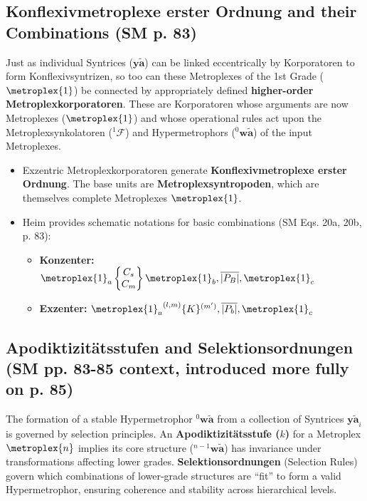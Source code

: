 \documentclass[
    12pt,              %
    a4paper,           %
    headings=normal,   %
    twoside=true,      %
    BCOR=8mm,          %
]{scrbook}
\newcommand{\q}[1]{\enquote{#1}}
\newcommand{\syntrix}{\bm{y\widetilde{a}}}
\newcommand{\aspektivsystem}{P}
\newcommand{\hypersyntrix}{\metroplex{1}}
\newcommand{\hypermetrophor}[1]{{}^{#1}\mathbf{w\widetilde{a}}}
\newcommand{\metroplexsynkolator}[1]{{}^{#1}\mathcal{F}}
\begin{document}
\subsection{Konflexivmetroplexe erster Ordnung and their Combinations (SM p. 83)}
\label{sec:ch5_hypersyntrix_konflexiv}
Just as individual Syntrices (\(\syntrix\)) can be linked eccentrically by Korporatoren to form Konflexivsyntrizen, so too can these Metroplexes of the 1st Grade (\(\hypersyntrix\)) be connected by appropriately defined \textbf{higher-order Metroplexkorporatoren}. These are Korporatoren whose arguments are now Metroplexes (\(\hypersyntrix\)) and whose operational rules act upon the Metroplexsynkolatoren (\(\metroplexsynkolator{1}\)) and Hypermetrophors (\(\hypermetrophor{0}\)) of the input Metroplexes.
\begin{itemize}
    \item   Exzentric Metroplexkorporatoren generate \textbf{Konflexivmetroplexe erster Ordnung}. The base units are \textbf{Metroplexsyntropoden}, which are themselves complete Metroplexes \(\hypersyntrix\).
    \item   Heim provides schematic notations for basic combinations (SM Eqs. 20a, 20b, p. 83):
        \begin{itemize}
            \item   \textbf{Konzenter:} \( \hypersyntrix_a \begin{Bmatrix} C_s \\ C_m \end{Bmatrix} \hypersyntrix_b, \overline{|\aspektivsystem_B|}, \hypersyntrix_c \)
            \item   \textbf{Exzenter:} \( {\hypersyntrix_a}^{(l,m)} \{ K \}^{(m')}, \overline{|\aspektivsystem_b|}, \hypersyntrix_c \)
        \end{itemize}
\end{itemize}

\subsection{Apodiktizitätsstufen and Selektionsordnungen (SM pp. 83-85 context, introduced more fully on p. 85)}
\label{sec:ch5_hypersyntrix_apodikt_selektion}
The formation of a stable Hypermetrophor \(\hypermetrophor{0}\) from a collection of Syntrices \(\syntrix_i\) is governed by selection principles. An \textbf{Apodiktizitätsstufe (\(k\))} for a Metroplex \(\metroplex{n}\) implies its core structure (\(\hypermetrophor{n-1}\)) has invariance under transformations affecting lower grades. \textbf{Selektionsordnungen} (Selection Rules) govern which combinations of lower-grade structures are \q{fit} to form a valid Hypermetrophor, ensuring coherence and stability across hierarchical levels.
\end{document}

